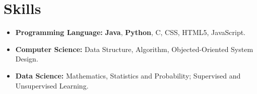 \documentclass[letterpaper,10pt]{article}
\begin{document}
\section{Skills}
\begin{itemize}[align=left]\setlength\itemsep{0em}
  \item \textbf{Programming Language:} \textbf{Java}, \textbf{Python}, C, CSS, HTML5, JavaScript.
  
  \item \textbf{Computer Science:} Data Structure, Algorithm, Objected-Oriented System Design. 
   
  \item \textbf{Data Science:} Mathematics, Statistics and Probability; Supervised and Unsupervised Learning.
  
\end{itemize}






\end{document}
